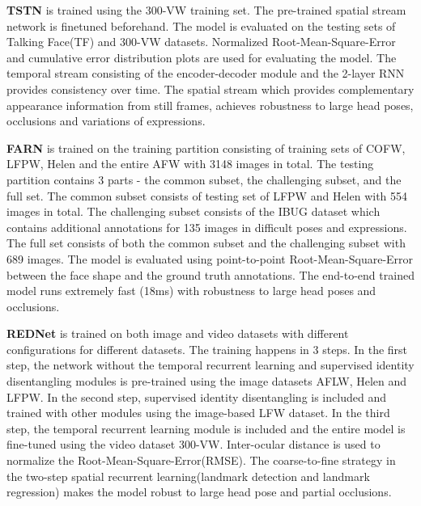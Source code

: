 \documentclass{llncs}
\begin{document}
	\textbf{TSTN} \cite{tstn} is trained using the 300-VW training set. The pre-trained spatial stream network is finetuned beforehand. The model is evaluated on the testing sets of Talking Face(TF) and 300-VW datasets. Normalized Root-Mean-Square-Error and cumulative error distribution plots are used for evaluating the model. The temporal stream consisting of the encoder-decoder module and the 2-layer RNN provides consistency over time.  The spatial stream which provides complementary appearance information from still frames, achieves robustness to large head poses, occlusions and variations of expressions.
	
	\textbf{FARN} \cite{farn} is trained on the training partition consisting of training sets of COFW, LFPW, Helen and the entire AFW with 3148 images in total. The testing partition contains 3 parts - the common subset, the challenging subset, and the full set. The common subset consists of testing set of LFPW and Helen with 554 images in total. The challenging subset consists of the IBUG dataset which contains additional annotations for 135 images in difficult poses and expressions. The full set consists of both the common subset and the challenging subset with 689 images. The model is evaluated using point-to-point Root-Mean-Square-Error between the face shape and the ground truth annotations. The end-to-end trained model runs extremely fast (18ms) with robustness to large head poses and occlusions.
	
	\textbf{REDNet} \cite{rednet} is trained on both image and video datasets with different configurations for different datasets. The training happens in 3 steps. In the first step, the network without the temporal recurrent learning and supervised identity disentangling modules is pre-trained using the image datasets AFLW, Helen and LFPW. In the second step, supervised identity disentangling is included and trained with other modules using the image-based LFW dataset. In the third step, the temporal recurrent learning module is included and the entire model is fine-tuned using the video dataset 300-VW. Inter-ocular distance is used to normalize the Root-Mean-Square-Error(RMSE).
	The coarse-to-fine strategy in the two-step spatial recurrent learning(landmark detection and landmark regression) makes the model robust to large head pose and partial occlusions.
	
\end{document}
